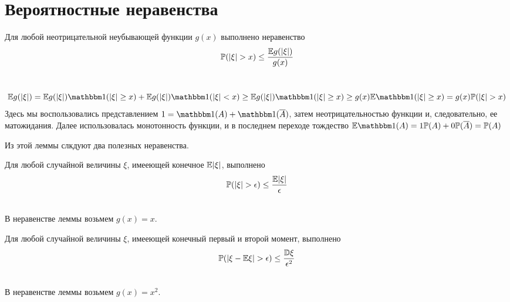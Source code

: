 \documentclass[../TV&MS.tex]{subfiles}
\begin{document}
    
\section{Вероятностные неравенства}
\begin{Lem}
Для любой неотрицательной неубывающей функции $g(x)$ выполнено неравенство 
$$\mathbb{P}(|\xi| > x) \le \frac{\mathbb{E} g(|\xi|)}{g(x)}$$
\end{Lem}
\begin{Proof} \\
$$\Expec g(|\xi|) = \Expec g(|\xi|) \Ind(|\xi| \ge x) + \Expec g(|\xi|) \Ind(|\xi| < x) \ge \Expec g(|\xi|) \Ind(|\xi| \ge x) \ge g(x)\Expec\Ind(|\xi| \ge x) = g(x)\Pro(|\xi| > x)$$
Здесь мы воспользовались представлением $1 = \Ind(A) + \Ind(\overline{A})$, затем неотрицательностью функции и, следовательно, ее матожидания. Далее использовалась монотонность функции, и в последнем переходе тождество $\Expec \Ind(A) = 1 \Pro(A) + 0 \Pro(\overline{A}) = \Pro(A)$
\end{Proof}

Из этой леммы слкдуют два полезных неравенства.

\begin{Th} 
Для любой случайной величины $\xi$, имееющей конечное $\mathbb{E}|\xi|$, выполнено
$$\mathbb{P}(|\xi| > \epsilon) \le \frac{\mathbb{E}|\xi|}{\epsilon}$$
\end{Th}
\begin{Proof}\\
В неравенстве леммы возьмем $g(x) = x$.
\end{Proof}

\begin{Th} 
Для любой случайной величины $\xi$, имееющей конечный первый и второй момент, выполнено
$$\mathbb{P}(|\xi - \mathbb{E}\xi| > \epsilon) \le \frac{\mathbb{D}\xi}{\epsilon^2}$$
\end{Th}
\begin{Proof}\\
В неравенстве леммы возьмем $g(x) = x^2$.
\end{Proof}

\newpage
\end{document}
